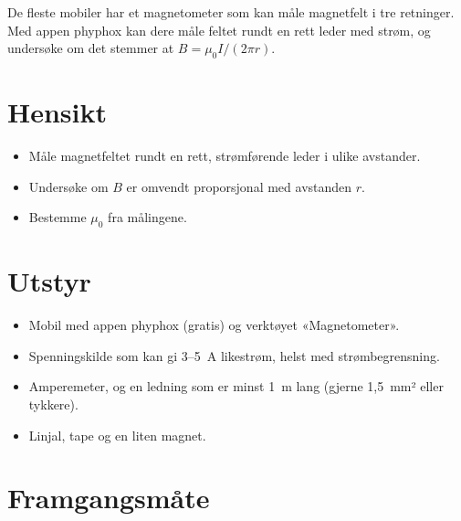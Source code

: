 \documentclass[11pt]{article}
\begin{document}

De fleste mobiler har et magnetometer som kan måle magnetfelt i tre retninger. Med appen phyphox kan dere måle feltet rundt en rett leder med strøm, og undersøke om det stemmer at $B = μ_{0}I/(2πr)$.

\section*{Hensikt}

\begin{itemize}
\item Måle magnetfeltet rundt en rett, strømførende leder i ulike avstander.
\item Undersøke om $B$ er omvendt proporsjonal med avstanden $r$.
\item Bestemme $μ_{0}$ fra målingene.
\end{itemize}

\section*{Utstyr}

\begin{itemize}
\item Mobil med appen phyphox (gratis) og verktøyet «Magnetometer».
\item Spenningskilde som kan gi 3–5~A likestrøm, helst med strømbegrensning.
\item Amperemeter, og en ledning som er minst 1~m lang (gjerne 1,5~mm² eller tykkere).
\item Linjal, tape og en liten magnet.
\end{itemize}

\section*{Framgangsmåte}
\end{document}
